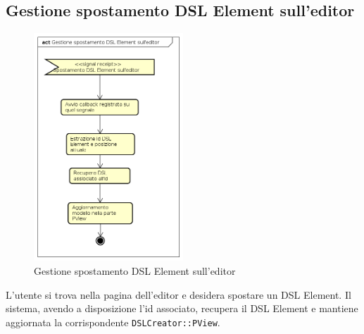     \subsection{Gestione spostamento DSL Element sull'editor}
    \begin{figure}[H]
      \centering
      \includegraphics[width=0.5\textwidth]{res/img/spostamentoDSLElement.png}
      \caption{Gestione spostamento DSL Element sull'editor}
      \label{fig:diagram_model}
    \end{figure}
    L'utente si trova nella pagina dell'editor e desidera spostare un DSL Element. Il sistema, avendo a disposizione l'id associato, recupera il DSL Element e mantiene aggiornata la corrispondente \texttt{DSLCreator::PView}.
